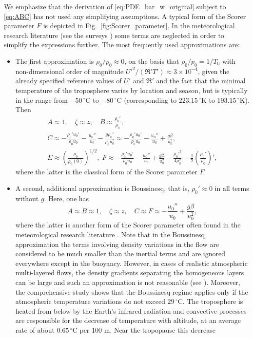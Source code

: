 \documentclass[11pt,twoside,reqno,centertags]{amsart}
\theoremstyle{definition}
\begin{document}
We emphasize that the derivation of \eqref{eq:PDE_bar_w_original} subject to \eqref{eq:ABC} has not used any simplifying assumptions. A typical form of the Scorer parameter $F$ is depicted in Fig.~\ref{fig:Scorer_parameter}. In the meteorological research literature (see the surveys \cite{Smith79, Smith19})  some terms are neglected in order to simplify the expressions further. The most frequently used approximations are:
\begin{itemize}
	\item The first approximation is $\rho_0/p_0\approx0$, on the basis that $\rho_0/p_0=1/T_0$ with non-dimensional order of magnitude $U'^2/({\mathfrak R}'T') \approx 3 \times 10^{-4}$, given the already specified 
	reference values of $U'$ and ${\mathfrak R}'$ and the fact that the 
	minimal temperature of the troposphere varies by location and season, but is typically in the range from $-50\,^\circ$C to $-80\,^\circ$C (corresponding to $223.15\,^\circ$K to $193.15\,^\circ$K). Then
	\begin{gather*}
		A\approx1,\quad\zeta\approx z,\quad B\approx\frac{\rho_0'}{\rho_0},\\
		C\approx-\frac{\rho_0'u_0'}{\rho_0u_0}-\frac{u_0''}{u_0}-\frac{g\rho_0'}{\rho_0u_0^2}\approx-\frac{\rho_0'u_0'}{\rho_0u_0}-\frac{u_0''}{u_0}+\frac{g\beta}{u_0^2},\\
		E\approx\left(\frac{\rho_0}{\rho_0(0)}\right)^{1/2},\;
		F\approx-\frac{\rho_0'u_0'}{\rho_0u_0}-\frac{u_0''}{u_0}+\frac{g\beta}{u_0^2}-\frac{\rho_0'^2}{4\rho_0^2}-\frac12\left(\frac{\rho_0'}{\rho_0}\right)',
	\end{gather*}
	where the latter is the classical form of the Scorer parameter $F$. 
	\item A second, additional approximation is Boussinesq, that is, $\rho_0'\approx0$ in all terms without $g$. Here, one has
	\[A\approx B\approx1,\quad\zeta\approx z,\quad C\approx F\approx-\frac{u_0''}{u_0}+\frac{g\beta}{u_0^2},\]
	where the latter is another form of the Scorer parameter often found in the meteorological research literature \cite{Smith79}. Note that in the Boussinesq approximation the terms involving density variations in the flow are considered to be much smaller than the inertial terms and are ignored everywhere except in the buoyancy. However, in cases of realistic atmospheric multi-layered flows, the density gradients separating the homogeneous layers can be large and such an approximation is not reasonable 
	(see \cite{ba, w}). Moreover, the comprehensive study \cite{gg} shows that the Boussinesq regime applies only if the atmospheric temperature variations do not exceed $29\,^\circ$C. The troposphere is heated from below by the Earth's infrared radiation and convective processes are responsible for the decrease of temperature with altitude, at an average rate of about $0.65\,^\circ$C per 100 m. Near the tropopause this decrease 

\end{itemize}
\end{document}
